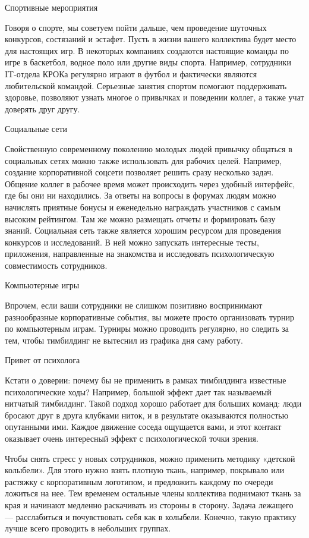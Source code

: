 \documentclass{../industrial-development}
\begin{document}
Спортивные мероприятия

Говоря о спорте, мы советуем пойти дальше, чем проведение шуточных конкурсов, состязаний и эстафет. Пусть в жизни вашего коллектива будет место для настоящих игр. В некоторых компаниях создаются настоящие команды по игре в баскетбол, водное поло или другие виды спорта. Например, сотрудники IT-отдела КРОКа регулярно играют в футбол и фактически являются любительской командой. Серьезные занятия спортом помогают поддерживать здоровье, позволяют узнать многое о привычках и поведении коллег, а также учат доверять друг другу.

Социальные сети

Свойственную современному поколению молодых людей привычку общаться в социальных сетях можно также использовать для рабочих целей. Например, создание корпоративной соцсети позволяет решить сразу несколько задач. Общение коллег в рабочее время может происходить через удобный интерфейс, где бы они ни находились. За ответы на вопросы в форумах людям можно начислять приятные бонусы и еженедельно награждать участников с самым высоким рейтингом. Там же можно размещать отчеты и формировать базу знаний. Социальная сеть также является хорошим ресурсом для проведения конкурсов и исследований. В ней можно запускать интересные тесты, приложения, направленные на знакомства и исследовать психологическую совместимость сотрудников.

Компьютерные игры

Впрочем, если ваши сотрудники не слишком позитивно воспринимают разнообразные корпоративные события, вы можете просто организовать турнир по компьютерным играм. Турниры можно проводить регулярно, но следить за тем, чтобы тимбилдинг не вытеснил из графика дня саму работу.

Привет от психолога

Кстати о доверии: почему бы не применить в рамках тимбилдинга известные психологические ходы? Например, большой эффект дает так называемый нитчатый тимбилдинг. Такой подход хорошо работает для больших команд: люди бросают друг в друга клубками ниток, и в результате оказываются полностью опутанными ими. Каждое движение соседа ощущается вами, и этот контакт оказывает очень интересный эффект с психологической точки зрения.

Чтобы снять стресс у новых сотрудников, можно применить методику «детской колыбели». Для этого нужно взять плотную ткань, например, покрывало или растяжку с корпоративным логотипом, и предложить каждому по очереди ложиться на нее. Тем временем остальные члены коллектива поднимают ткань за края и начинают медленно раскачивать из стороны в сторону. Задача лежащего — расслабиться и почувствовать себя как в колыбели. Конечно, такую практику лучше всего проводить в небольших группах.
\end{document}
